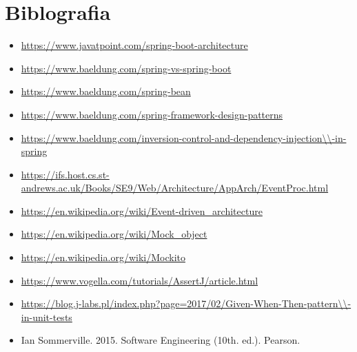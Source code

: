 \documentclass[a4paper,12pt,openany,oneside]{book}
\begin{document}
\chapter{Biblografia}
\begin{itemize}
\item\url{https://www.javatpoint.com/spring-boot-architecture}
\item\url{https://www.baeldung.com/spring-vs-spring-boot}
\item\url{https://www.baeldung.com/spring-bean}
\item\url{https://www.baeldung.com/spring-framework-design-patterns}
\item\url{https://www.baeldung.com/inversion-control-and-dependency-injection\\-in-spring}
\item\url{https://ifs.host.cs.st-andrews.ac.uk/Books/SE9/Web/Architecture/AppArch/EventProc.html}
\item\url{https://en.wikipedia.org/wiki/Event-driven_architecture}
\item\url{https://en.wikipedia.org/wiki/Mock_object}
\item\url{https://en.wikipedia.org/wiki/Mockito}
\item\url{https://www.vogella.com/tutorials/AssertJ/article.html}
\item\url{https://blog.j-labs.pl/index.php?page=2017/02/Given-When-Then-pattern\\-in-unit-tests}
\item Ian Sommerville. 2015. Software Engineering (10th. ed.). Pearson.
\end{itemize}
\end{document}
